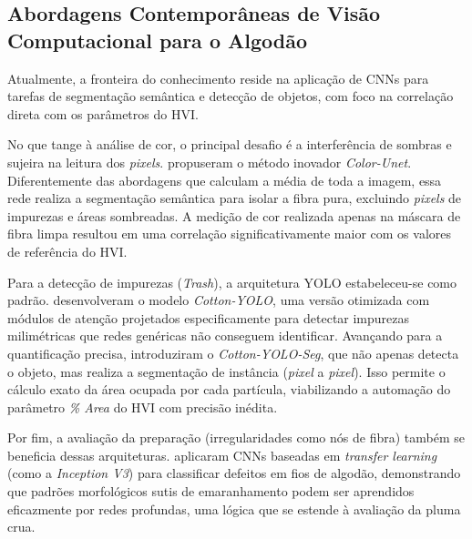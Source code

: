 \subsection{Abordagens Contemporâneas de Visão Computacional para o Algodão}

    Atualmente, a fronteira do conhecimento reside na aplicação de CNNs para tarefas de segmentação semântica e detecção de objetos, com foco na correlação direta com os parâmetros do HVI.

    No que tange à análise de cor, o principal desafio é a interferência de sombras e sujeira na leitura dos \textit{pixels}.  propuseram o método inovador \textit{Color-Unet}. Diferentemente das abordagens que calculam a média de toda a imagem, essa rede realiza a segmentação semântica para isolar a fibra pura, excluindo \textit{pixels} de impurezas e áreas sombreadas. A medição de cor realizada apenas na máscara de fibra limpa resultou em uma correlação significativamente maior com os valores de referência do HVI.

    Para a detecção de impurezas (\textit{Trash}), a arquitetura YOLO estabeleceu-se como padrão.  desenvolveram o modelo \textit{Cotton-YOLO}, uma versão otimizada com módulos de atenção projetados especificamente para detectar impurezas milimétricas que redes genéricas não conseguem identificar. Avançando para a quantificação precisa,  introduziram o \textit{Cotton-YOLO-Seg}, que não apenas detecta o objeto, mas realiza a segmentação de instância (\textit{pixel} a \textit{pixel}). Isso permite o cálculo exato da área ocupada por cada partícula, viabilizando a automação do parâmetro \textit{\% Area} do HVI com precisão inédita.

    Por fim, a avaliação da preparação (irregularidades como nós de fibra) também se beneficia dessas arquiteturas.  aplicaram CNNs baseadas em \textit{transfer learning} (como a \textit{Inception V3}) para classificar defeitos em fios de algodão, demonstrando que padrões morfológicos sutis de emaranhamento podem ser aprendidos eficazmente por redes profundas, uma lógica que se estende à avaliação da pluma crua.